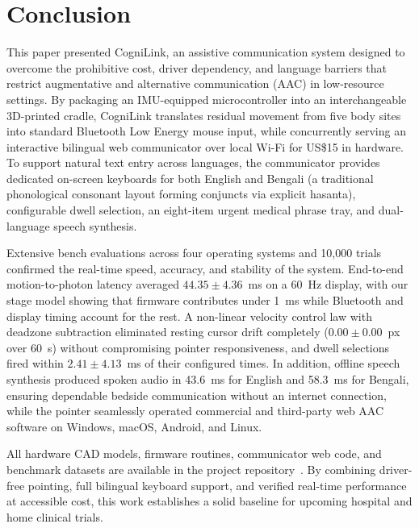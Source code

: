 \documentclass[journal]{IEEEtran}
\begin{document}
\section{Conclusion}
\label{sec:conclusion}

This paper presented CogniLink, an assistive communication system designed to overcome the prohibitive cost, driver dependency, and language barriers that restrict augmentative and alternative communication (AAC) in low-resource settings. By packaging an IMU-equipped microcontroller into an interchangeable 3D-printed cradle, CogniLink translates residual movement from five body sites into standard Bluetooth Low Energy mouse input, while concurrently serving an interactive bilingual web communicator over local Wi-Fi for US\$15 in hardware. To support natural text entry across languages, the communicator provides dedicated on-screen keyboards for both English and Bengali (a traditional phonological consonant layout forming conjuncts via explicit hasanta), configurable dwell selection, an eight-item urgent medical phrase tray, and dual-language speech synthesis.

Extensive bench evaluations across four operating systems and 10,000 trials confirmed the real-time speed, accuracy, and stability of the system. End-to-end motion-to-photon latency averaged $44.35\pm4.36$~ms on a 60~Hz display, with our stage model showing that firmware contributes under 1~ms while Bluetooth and display timing account for the rest. A non-linear velocity control law with deadzone subtraction eliminated resting cursor drift completely ($0.00\pm0.00$~px over 60~s) without compromising pointer responsiveness, and dwell selections fired within $2.41\pm4.13$~ms of their configured times. In addition, offline speech synthesis produced spoken audio in 43.6~ms for English and 58.3~ms for Bengali, ensuring dependable bedside communication without an internet connection, while the pointer seamlessly operated commercial and third-party web AAC software on Windows, macOS, Android, and Linux.

All hardware CAD models, firmware routines, communicator web code, and benchmark datasets are available in the project repository~\cite{cognilink_repo}. By combining driver-free pointing, full bilingual keyboard support, and verified real-time performance at accessible cost, this work establishes a solid baseline for upcoming hospital and home clinical trials.
\end{document}
